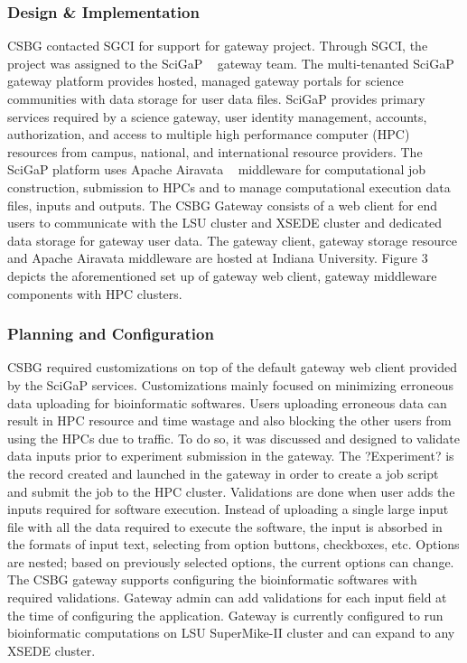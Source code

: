 \documentclass[sigconf]{acmart}
\begin{document}
\subsubsection{Design \& Implementation}
CSBG contacted SGCI for support for gateway project. Through SGCI, the project was assigned to the SciGaP ~\cite{scigap} gateway team. The multi-tenanted SciGaP gateway platform provides hosted, managed gateway portals for science communities with data storage for user data files. SciGaP provides primary services required by a science gateway, user identity management, accounts, authorization, and access to multiple high performance computer (HPC) resources from campus, national, and international resource providers. The SciGaP platform uses Apache Airavata ~\cite{airavata} middleware for computational job construction, submission to HPCs and to manage computational execution data files, inputs and outputs. The CSBG Gateway consists of a web client for end users to communicate with the LSU cluster and XSEDE cluster and dedicated data storage for gateway user data. The gateway client, gateway storage resource and Apache Airavata middleware are hosted at Indiana University. Figure  3 depicts the aforementioned set up of gateway web client, gateway middleware components with HPC clusters.

\subsubsection{Planning and Configuration}
CSBG required customizations on top of the default gateway web client provided by the SciGaP services. Customizations mainly focused on minimizing erroneous data uploading for bioinformatic softwares. Users uploading erroneous data can result in HPC resource and time wastage and also blocking the other users from using the HPCs due to traffic. To do so, it was discussed and designed to validate data inputs prior to experiment submission in the gateway. The ?Experiment? is the record created and launched in the gateway in order to create a job script and submit the job to the HPC cluster. Validations are done when user adds the inputs required for software execution. Instead of uploading a single large input file with all the data required to execute the software, the input is absorbed in the formats of input text, selecting from option buttons, checkboxes, etc. Options are nested; based on previously selected options, the current options can change. The CSBG gateway supports configuring the bioinformatic softwares with required validations. Gateway admin can add validations for each input field at the time of configuring the application.
Gateway is currently configured to run bioinformatic computations on LSU SuperMike-II cluster and can expand to any XSEDE cluster. 
\end{document}
